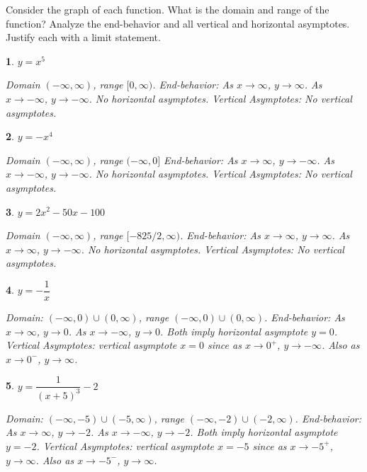 \documentclass{amsbook}
\newtheorem{exc}{}
\newenvironment{ex}{\begin{exc}\normalfont}{\end{exc}}
\numberwithin{section}{chapter}
\numberwithin{equation}{chapter}
\begin{document}
Consider the graph of each function. What is the domain and range of the function? Analyze the end-behavior and all vertical and horizontal asymptotes. Justify each with a limit statement.

\begin{multicols}{2}
	\begin{ex}
		$y= x^5$
		\begin{sol}
			Domain $(-\infty, \infty)$, range $[0, \infty)$.
			End-behavior: As $x\to\infty$, $y\to\infty$. As $x\to-\infty$, $y\to-\infty$. No horizontal asymptotes.
			Vertical Asymptotes: No vertical asymptotes.
		\end{sol}
	\end{ex}
	\begin{ex}
	$y= -x^4$
	\begin{sol}
		Domain $(-\infty, \infty)$, range $(-\infty, 0]$
		End-behavior: As $x\to\infty$, $y\to-\infty$. As $x\to-\infty$, $y\to-\infty$. No horizontal asymptotes.
		Vertical Asymptotes: No vertical asymptotes.
	\end{sol}
\end{ex}
	\begin{ex}
	$y= 2x^2-50x-100$
	\begin{sol}
		Domain $(-\infty, \infty)$, range $[-825/2, \infty)$.
		End-behavior: As $x\to\infty$, $y\to\infty$. As $x\to\infty$, $y\to-\infty$. No horizontal asymptotes.
		Vertical Asymptotes: No vertical asymptotes.
	\end{sol}
\end{ex}
	\begin{ex}
	$y= -\dfrac{1}{x}$
	\begin{sol}
		Domain: $(-\infty, 0)\cup(0, \infty)$, range $(-\infty, 0)\cup(0, \infty)$.
		End-behavior: As $x\to\infty$, $y\to0$. As $x\to-\infty$, $y\to0$. Both imply horizontal asymptote $y=0$.
		Vertical Asymptotes: vertical asymptote $x=0$ since as $x\to 0^+$, $y\to-\infty$. Also as $x\to 0^-$, $y\to\infty$.
	\end{sol}
\end{ex}
	\begin{ex}
	$y= \dfrac{1}{(x+5)^3}-2$
	\begin{sol}
		Domain: $(-\infty, -5)\cup(-5, \infty)$, range $(-\infty, -2)\cup(-2, \infty)$.
		End-behavior: As $x\to\infty$, $y\to-2$. As $x\to-\infty$, $y\to-2$. Both imply horizontal asymptote $y=-2$.
		Vertical Asymptotes: vertical asymptote $x=-5$ since as $x\to -5^+$, $y\to\infty$. Also as $x\to -5^-$, $y\to\infty$.
	\end{sol}
\end{ex}

\end{multicols}
\end{document}
